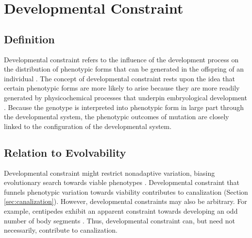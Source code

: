 \section{Developmental Constraint} \label{sec:developmental_constraint}

\subsection{Definition}
Developmental constraint refers to the influence of the development process on the distribution of phenotypic forms that can be generated in the offspring of an individual \cite{Smith1985DevelopmentalBiology}. The concept of developmental constraint rests upon the idea that certain phenotypic forms are more likely to arise because they are more readily generated by physicochemical processes that underpin embryological development \cite{Smith1985DevelopmentalBiology}. Because the genotype is interpreted into phenotypic form in large part through the developmental system, the phenotypic outcomes of mutation are closely linked to the configuration of the developmental system.

\subsection{Relation to Evolvability}
Developmental constraint might restrict nonadaptive variation, biasing evolutionary search towards viable phenotypes \cite[pg 40]{Downing2015IntelligenceSystems}.
Developmental constraint that funnels phenotypic variation towards viability contributes to canalization (Section \ref{sec:canalization}). 
However, developmental constraints may also be arbitrary.
For example, centipedes exhibit an apparent constraint towards developing an odd number of body segments \cite{Arthur1999TheEvolution}.
Thus, developmental constraint can, but need not necessarily, contribute to canalization.

